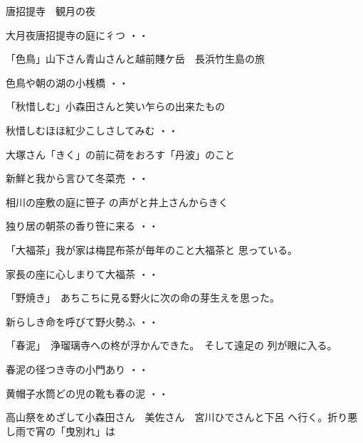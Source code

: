 \vspace{0.6cm}
唐招提寺　観月の夜
\begin{shiika}大月夜唐招提寺の庭に彳つ
\hfill{・・}\end{shiika}
\vspace{0.6cm}
「色鳥」山下さん青山さんと越前賤ケ岳　長浜竹生島の旅
\begin{shiika}色鳥や朝の湖の小桟橋
\hfill{・・}\end{shiika}
\vspace{0.6cm}
「秋惜しむ」小森田さんと笑い乍らの出来たもの
\begin{shiika}秋惜しむほほ紅少こしさしてみむ
\hfill{・・}\end{shiika}
\vspace{0.6cm}
大塚さん「きく」の前に荷をおろす「丹波」のこと
\begin{shiika}新鮮と我から言ひて冬菜売
\hfill{・・}\end{shiika}
\vspace{0.6cm}
相川の座敷の庭に笹子
の声がと井上さんからきく
\begin{shiika}独り居の朝茶の香り笹に来る
\hfill{・・}\end{shiika}
\vspace{0.6cm}
「大福茶」我が家は梅昆布茶が毎年のこと大福茶と
思っている。
\begin{shiika}家長の座に心しまりて大福茶
\hfill{・・}\end{shiika}
\vspace{0.6cm}
「野焼き」　あちこちに見る野火に次の命の芽生えを思った。
\begin{shiika}新らしき命を呼びて野火勢ふ
\hfill{・・}\end{shiika}
\vspace{0.6cm}
「春泥」　浄瑠璃寺への柊が浮かんできた。　そして遠足の
列が眼に入る。
\begin{shiika}春泥の径つき寺の小門あり
\hfill{・・}\end{shiika}
\begin{shiika}黄帽子水筒どの児の靴も春の泥
\hfill{・・}\end{shiika}
\vspace{0.6cm}
高山祭をめざして小森田さん　美佐さん　宮川ひでさんと下呂
へ行く。折り悪し雨で宵の「曳別れ」は
